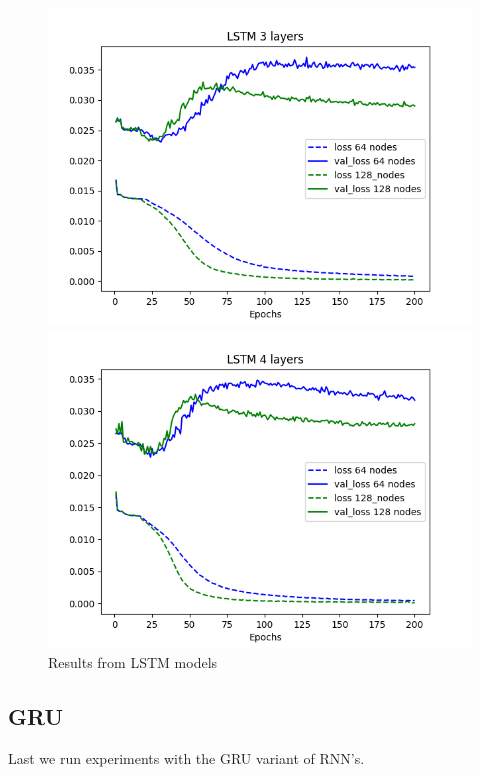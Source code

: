 \documentclass[11pt]
{article}
\begin{document}
\begin{figure}[H]
\begin{minipage}[b]{0.33\linewidth}
		\includegraphics[width=\linewidth]{../TESTS_RESULTS/LSTM_tests/plots/3_comp.png} 
	\end{minipage}%
	\begin{minipage}[b]{0.33\linewidth}
		\centering
		\includegraphics[width=\linewidth]{../TESTS_RESULTS/LSTM_tests/plots/4_comp.png} 
	\end{minipage} 
\caption{Results from LSTM models} 
\end{figure}

\subsection{GRU}
Last we run experiments with the GRU variant of RNN's. 
\end{document}
